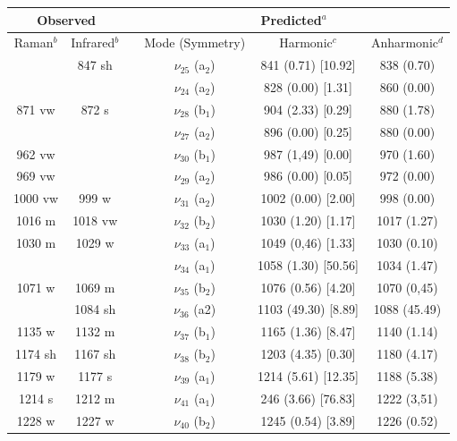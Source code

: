 	\begin{table}[H]
		\begin{center}
				\begin{threeparttable}
			\begin{tabular}{c c c c c c}
				\hline
				\multicolumn{ 2}{c}{Observed} & \multicolumn{1}{c}{} & \multicolumn{ 3}{c}{Predicted$^{a}$} \\ \hline
				Raman$^{b}$ & \multicolumn{1}{c}{Infrared$^{b}$} &  & \multicolumn{1}{c}{Mode (Symmetry)} & \multicolumn{1}{c}{Harmonic$^{c}$} & Anharmonic$^{d}$ \\ \hline
					& 847 sh & &$\nu_{25}$ (a$_{2}$) & 841 (0.71) [10.92] & 838 (0.70) \\ 
					&  & & $\nu_{24}$ (a$_{2}$) & 828 (0.00) [1.31] & 860 (0.00) \\ 
871 vw & 872 s & &$\nu_{28}$ (b$_{1}$) & 904 (2.33) [0.29] & 880 (1.78) \\
&  & &$\nu_{27}$ (a$_{2}$) & 896 (0.00) [0.25] & 880 (0.00) \\ 
962 vw &  & &$\nu_{30}$ (b$_{1}$)& 987 (1,49) [0.00] & 970 (1.60) \\ 
	969 vw &  & &$\nu_{29} $ (a$_{2}$) & 986 (0.00) [0.05] & 972 (0.00) \\ 
 1000 vw&999 w & &$\nu_{31}$ (a$_{2}$) & 1002 (0.00) [2.00] & 998 (0.00) \\ 
	1016 m & 1018 vw& &$\nu_{32}$ (b$_{2}$) & 1030 (1.20) [1.17] & 1017 (1.27) \\ 
1030 m	& 1029 w & &$\nu_{33}$ (a$_{1}$) & 1049 (0,46) [1.33] & 1030 (0.10) \\ 
	 & & &$\nu_{34}$ (a$_{1}$) & 1058 (1.30) [50.56] & 1034 (1.47) \\ 
1071 w	& 1069 m & &$\nu_{35}$ (b$_{2}$) & 1076 (0.56) [4.20] & 1070 (0,45) \\ 
 &1084 sh & &$\nu_{36}$ (a2) & 1103 (49.30) [8.89] &  1088 (45.49) \\ 
1135 w &1132 m 	& &$\nu_{37}$ (b$_{1}$) & 1165 (1.36) [8.47] & 1140 (1.14)	\\ 
1174 sh &1167 sh	& &$\nu_{38}$ (b$_{2}$) & 1203 (4.35) [0.30] &  	1180 (4.17) \\
1179 w & 1177 s &  &  $\nu_{39}$ (a$_{1}$) & 1214 (5.61) [12.35] & 1188 (5.38)\\
1214 s & 1212 m         
&  & \multicolumn{1}{c}{$\nu_{41}$ (a$_{1}$)} & 246 (3.66) [76.83] & 1222 (3,51) \\ 
1228 w & 1227 w &  & \multicolumn{1}{c}{$\nu_{40}$ (b$_{2}$)} & 1245 (0.54) [3.89] & 1226 (0.52) \\ 

\end{tabular}
\end{threeparttable}
\end{center}
\end{table}
